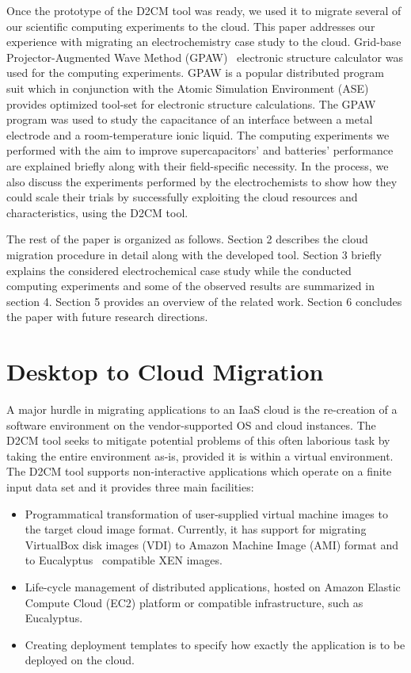 \documentclass[a4paper,10pt]{article}
\begin{document}
Once the prototype of the D2CM tool was ready, we used it to migrate several of our scientific computing experiments to the cloud. This paper addresses our experience with migrating an electrochemistry case study to the cloud. Grid-base Projector-Augmented Wave Method (GPAW)~\cite{GPAW2} electronic structure calculator was used for the computing experiments. GPAW is a popular distributed program suit which in conjunction with the Atomic Simulation Environment (ASE) \cite{ase} provides optimized tool-set for electronic structure calculations. The GPAW program was used to study the capacitance of an interface between a metal electrode and a room-temperature ionic liquid. The computing experiments we performed with the aim to improve supercapacitors' and batteries' performance \cite{ivanistsev2012} are explained briefly along with their field-specific necessity. In the process, we also discuss the experiments performed by the electrochemists to show how they could scale their trials by successfully exploiting the cloud resources and characteristics, using the D2CM tool.

The rest of the paper is organized as follows. Section 2 describes the cloud migration procedure in detail along with the developed tool. Section 3 briefly explains the considered electrochemical case study while the conducted computing experiments and some of the observed results are summarized in section 4. Section 5 provides an overview of the related work. Section 6 concludes the paper with future research directions.

\section{Desktop to Cloud Migration}
A major hurdle in migrating applications to an IaaS cloud is the re-creation of a software environment on the vendor-supported OS and cloud instances. The D2CM tool seeks to mitigate potential problems of this often laborious task by taking the entire environment as-is, provided it is within a virtual environment. The D2CM tool supports non-interactive applications which operate on a finite input data set and it provides three main facilities: 

\begin{itemize}
\item{Programmatical transformation of user-supplied virtual machine images to the target cloud image format. Currently, it has support for migrating VirtualBox disk images (VDI) to Amazon Machine Image (AMI) format and to Eucalyptus~\cite{Euca:site} compatible XEN \cite{Barham:2003:XAV:1165389.945462} images.}
\item{Life-cycle management of distributed applications, hosted on Amazon Elastic Compute Cloud (EC2) \cite{Amazon:EC2} platform or compatible infrastructure, such as Eucalyptus.}
\item{Creating deployment templates to specify how exactly the application is to be deployed on the cloud.}
\end{itemize}
\end{document}
